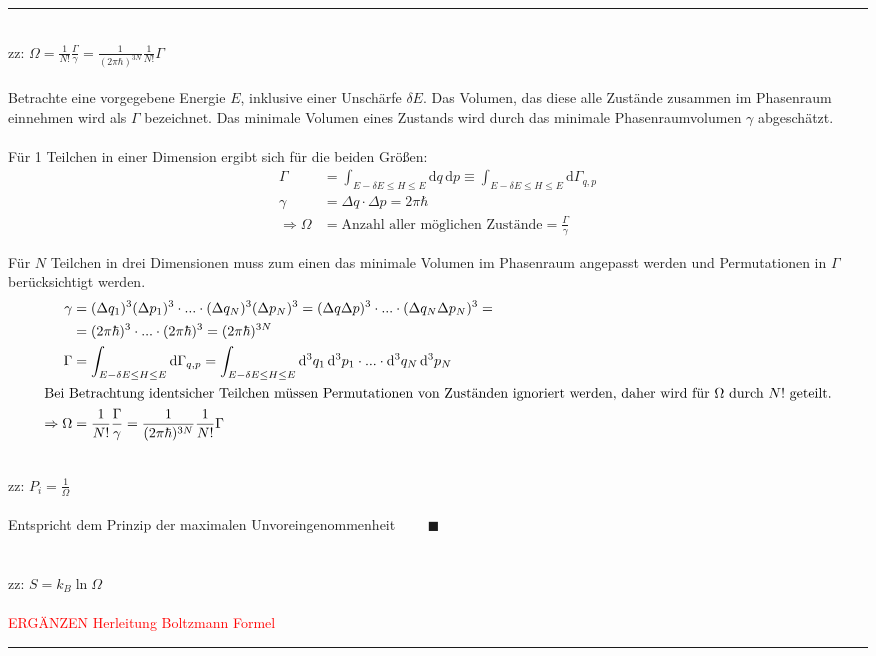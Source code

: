 \documentclass{article}
\newcommand{\diff}{\mathrm{d}}
\begin{document}
{\color{violet}
\hrule
	\\
	zz: $\Omega = \frac{1}{N!}\frac{\Gamma}{\gamma} = \frac{1}{(2\pi\hbar)^{3N}} \frac{1}{N!} \Gamma$\\
	\\
	Betrachte eine vorgegebene Energie $E$, inklusive einer Unschärfe $\delta E$. Das Volumen, das diese alle Zustände zusammen im Phasenraum einnehmen wird als $\Gamma$ bezeichnet. Das minimale Volumen eines Zustands wird durch das minimale Phasenraumvolumen $\gamma$ abgeschätzt.\\
	\\
	Für 1 Teilchen in einer Dimension ergibt sich für die beiden Größen:
		\begin{align*}
			\Gamma &= \int_{E-\delta E \leq H \leq E} \diff q\, \diff p \equiv \int_{E-\delta E \leq H \leq E} \diff\Gamma_{q,p}\\
			\gamma &= \Delta q \cdot \Delta p = 2\pi\hbar \\
			\Rightarrow \Omega &= \text{Anzahl aller möglichen Zustände} = \frac{\Gamma}{\gamma}
		\end{align*}

	Für $N$ Teilchen in drei Dimensionen muss zum einen das minimale Volumen im Phasenraum angepasst werden und Permutationen in $\Gamma$ berücksichtigt werden.
		\begin{align*}
			\gamma &= (\Delta q_1)^3 (\Delta p_1)^3 \cdot ... \cdot (\Delta q_N)^3 (\Delta p_N)^3 = (\Delta q \Delta p)^3 \cdot ... \cdot (\Delta q_N \Delta p_N)^3 = \\
			 &= (2\pi\hbar)^3 \cdot ... \cdot (2\pi\hbar)^3 = (2\pi\hbar)^{3N} \\
			 \Gamma &= \int_{E-\delta E \leq H \leq E} \diff \Gamma_{q,p} = \int_{E-\delta E \leq H \leq E} \diff^3 q_1\, \diff^3 p_1 \cdot ... \cdot \diff^3q_N\, \diff^3 p_N \\
		\intertext{Bei Betrachtung identsicher Teilchen müssen Permutationen von Zuständen ignoriert werden, daher wird für $\Omega$ durch $N!$ geteilt.}
			\Rightarrow \Omega &= \frac{1}{N!}\frac{\Gamma}{\gamma} = \frac{1}{(2\pi\hbar)^{3N}} \frac{1}{N!} \Gamma
		\end{align*}
	
	
	\\
	zz: $P_i = \frac{1}{\Omega}$\\
	\\
	Entspricht dem Prinzip der maximalen Unvoreingenommenheit $\qquad \blacksquare$\\
	\\
	\\
	zz: $S = k_B \ln\Omega$\\
	\\
	\textcolor{red}{ERGÄNZEN Herleitung Boltzmann Formel}
\hrule
}
\end{document}
